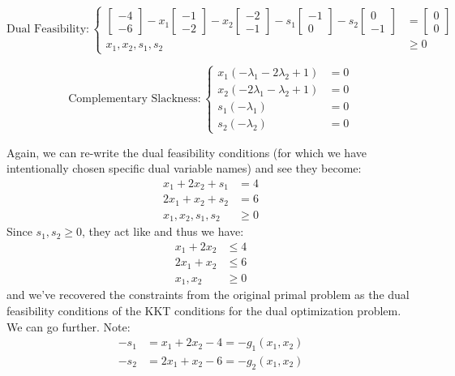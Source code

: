 $$\text{Dual Feasibility}:\left\{
\begin{aligned}
\begin{bmatrix}-4\\-6\end{bmatrix} - x_1\begin{bmatrix}-1\\-2\end{bmatrix} - 
x_2\begin{bmatrix}-2\\-1\end{bmatrix} -s_1\begin{bmatrix}-1\\0\end{bmatrix} - 
s_2\begin{bmatrix}0\\-1\end{bmatrix} &= \begin{bmatrix}0\\0\end{bmatrix}\\
x_1,x_2,s_1,s_2 & \geq 0
\end{aligned}
\right.$$

$$\text{Complementary Slackness}:\left\{
    \begin{aligned}
    x_1(-\lambda_1 - 2\lambda_2 + 1) &= 0\\
    x_2(-2\lambda_1 - \lambda_2 + 1) &= 0\\
    s_1(-\lambda_1) &= 0\\
    s_2(-\lambda_2) &= 0
    \end{aligned}
    \right.$$

Again, we can re-write the dual feasibility conditions (for which we have intentionally chosen specific dual variable names) and see they become:
\begin{equation}
\begin{aligned}
x_1 + 2x_2 + s_1 &= 4\\
2x_1 + x_2 + s_2 & =6\\
x_1,x_2, s_1, s_2 &\geq 0
\end{aligned}
\end{equation}
Since $s_1, s_2 \geq 0$, they act like  and thus we have:
\begin{equation}
\begin{aligned}
x_1 + 2x_2 &\leq  4\\
2x_1 + x_2 &\leq 6\\
x_1,x_2&\geq 0
\end{aligned}
\end{equation}
and we've recovered the constraints from the original primal problem as the dual feasibility conditions of the KKT conditions for the dual optimization problem. We can go further. Note:
\begin{equation}
    \begin{aligned}
        -s_1 &= x_1 + 2x_2 - 4= -g_1(x_1,x_2)\\
-s_2 &= 2x_1 + x_2 -6 = -g_2(x_1,x_2)
    \end{aligned}
\end{equation}


